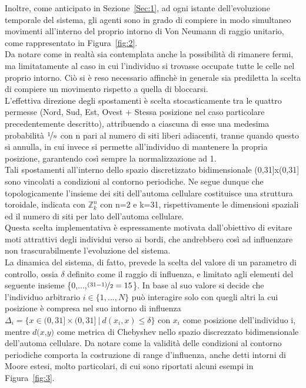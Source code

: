 \documentclass{article}
\newcommand{\Zn}{$\mathbb{Z}^n_k$ } %
\begin{document}
Inoltre, come anticipato in Sezione~\ref{Sec:1}, ad ogni istante dell’evoluzione temporale del sistema, gli agenti sono in grado di compiere in modo simultaneo movimenti all'interno del proprio intorno di Von Neumann di raggio unitario, come rappresentato in Figura~\ref{fig:2}.
\\ Da notare come in realtà sia contemplata anche la possibilità di rimanere fermi, ma limitatamente al caso in cui l'individuo si trovasse occupate tutte le celle nel proprio intorno. Ciò si è reso necessario affinchè in generale sia prediletta la scelta di compiere un movimento rispetto a quella di bloccarsi.
\\ L'effettiva direzione degli spostamenti è scelta stocasticamente tra le quattro permesse (Nord, Sud, Est, Ovest + Stessa posizione nel caso particolare precedentemente descritto), attribuendo a ciascuna di esse una medesima probabilità $\nicefrac{1}{n}$ con n pari al numero di siti liberi adiacenti, tranne quando questo si annulla, in cui invece si permette all’individuo di mantenere la propria posizione, garantendo così sempre la normalizzazione ad 1.
\\ Tali spostamenti all’interno dello spazio discretizzato bidimensionale (0,31]x(0,31] sono vincolati a condizioni al contorno periodiche. Ne segue dunque che topologicamente l’insieme dei siti dell’automa cellulare costituisce una struttura toroidale, indicata con \Zn con n=2 e k=31, rispettivamente le dimensioni spaziali ed il numero di siti per lato dell'automa cellulare.
\\ Questa scelta implementativa è espressamente motivata dall’obiettivo di evitare moti attrattivi degli individui verso ai bordi, che andrebbero così ad influenzare non trascurabilmente l’evoluzione del sistema.
\\ La dinamica del sistema, di fatto, prevede la scelta del valore di un parametro di controllo, ossia $\delta$ definito come il raggio di influenza, e limitato agli elementi del seguente insieme \{0,...,$\nicefrac{(31-1)}{2}=15$\}. In base al suo valore si decide che l'individuo arbitrario $\textit{i} \in \{1,...,\textit{N} \}$ può interagire solo con quegli altri la cui posizione è compresa nel suo intorno di influenza $\Delta_{i} = \{ x \in (0,31] \times (0,31] \ | \ d(x_{i},x)\leqslant \delta \}$ con $\textit{$x_{i}$}$ come posizione dell'individuo i, mentre $\textit{d(x,y)}$ come metrica di Chebyshev nello spazio discrezzato bidimensionale dell'automa cellulare. Da notare come la validità delle condizioni al contorno periodiche comporta la costruzione di range d'influenza, anche detti intorni di Moore estesi, molto particolari, di cui sono riportati alcuni esempi in Figura~\ref{fig:3}.
\end{document}
